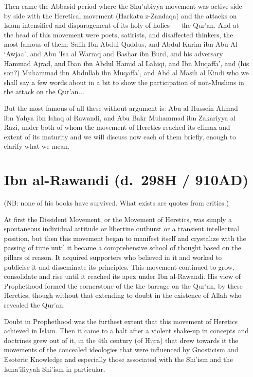 \documentclass[12pt]{book}
\begin{document}
Then came the Abbasid period where the Shu’ubiyya movement was active side by
side with the Heretical movement (Harkatu z-Zandaqa) and the attacks on Islam
intensified and disparagement of its holy of holies — the Qur’an. And at the
head of this movement were poets, satirists, and disaffected thinkers, the most
famous of them: Salih Ibn Abdul Quddus, and Abdul Karim ibn Abu Al ‘Awjaa’, and
Abu ’Isa al Warraq and Bashar ibn Burd, and his adversary Hammad Ajrad, and
Iban ibn Abdul Hamid al Lahiqi, and Ibn Muqaffa’, and (his son?) Muhammad ibn
Abdullah ibn Muqaffa’, and Abd al Masih al Kindi who we shall say a few words
about in a bit to show the participation of non-Muslims in the attack on the
Qur’an...

But the most famous of all these without argument is: Abu al Hussein Ahmad ibn
Yahya ibn Ishaq al Rawandi, and Abu Bakr Muhammad ibn Zakariyya al Razi, under
both of whom the movement of Heretics reached its climax and extent of its
maturity and we will discuss now each of them briefly, enough to clarify what
we mean.


\section{Ibn al-Rawandi (d.\ 298H / 910AD)}

(NB: none of his books have survived. What exists are quotes from critics.)

At first the Dissident Movement, or the Movement of Heretics, was simply a
spontaneous individual attitude or libertine outburst or a transient
intellectual position, but then this movement began to manifest itself and
crystalize with the passing of time until it became a comprehensive school of
thought based on the pillars of reason. It acquired supporters who believed in
it and worked to publicise it and disseminate its principles. This movement
continued to grow, consolidate and rise until it reached its apex under Ibn
al-Rawandi. His view of Prophethood formed the cornerstone of the the barrage
on the Qur’an, by these Heretics, though without that extending to doubt in the
existence of Allah who revealed the Qur’an.

Doubt in Prophethood was the furthest extent that this movement of Heretics
achieved in Islam. Then it came to a halt after a violent shake-up in concepts
and doctrines grew out of it, in the 4th century (of Hijra) that drew towards
it the movements of the concealed ideologies that were influenced by Gnosticism
and Esoteric Knowledge and especially those associated with the Shi’ism and the
Isma’iliyyah Shi’ism in particular.
\end{document}
